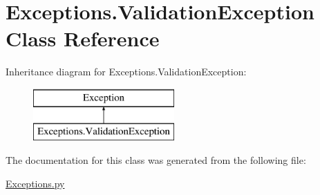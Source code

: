 \hypertarget{classExceptions_1_1ValidationException}{}\section{Exceptions.\+Validation\+Exception Class Reference}
\label{classExceptions_1_1ValidationException}
Inheritance diagram for Exceptions.\+Validation\+Exception\+:\begin{figure}[H]
\begin{center}
\leavevmode
\includegraphics[height=2.000000cm]{classExceptions_1_1ValidationException}
\end{center}
\end{figure}


The documentation for this class was generated from the following file\+:\begin{DoxyCompactItemize}
\item 
\mbox{\hyperlink{Exceptions_8py}{Exceptions.\+py}}\end{DoxyCompactItemize}
